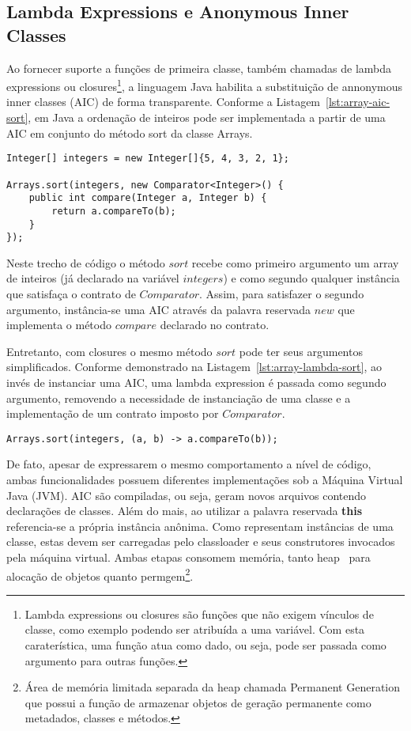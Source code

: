 \documentclass[10pt, conference]{IEEEtran}
\begin{document}
\subsection{Lambda Expressions e Anonymous Inner Classes}
Ao fornecer suporte a funções de primeira classe, também chamadas de lambda expressions ou closures\footnote{Lambda expressions ou closures são funções que não exigem vínculos de classe, como exemplo podendo ser atribuída a uma variável. Com esta caraterística, uma função atua como dado, ou seja, pode ser passada como argumento para outras funções.}, a linguagem Java habilita a substituição de annonymous inner classes (AIC) de forma transparente. Conforme a Listagem~\ref{lst:array-aic-sort}, em Java a ordenação de inteiros pode ser implementada a partir de uma AIC em conjunto do método sort da classe Arrays.

\begin{lstlisting}[caption={Sort - Anonymous Inner Class}, label={lst:array-aic-sort}]
Integer[] integers = new Integer[]{5, 4, 3, 2, 1};

Arrays.sort(integers, new Comparator<Integer>() {
    public int compare(Integer a, Integer b) {
        return a.compareTo(b);
    }
});
\end{lstlisting}

Neste trecho de código o método $sort$ recebe como primeiro argumento um array de inteiros (já declarado na variável $integers$) e como segundo qualquer instância que satisfaça o contrato de $Comparator$. Assim, para satisfazer o segundo argumento, instância-se uma AIC através da palavra reservada $new$ que implementa o método $compare$ declarado no contrato.

Entretanto, com closures o mesmo método $sort$ pode ter seus argumentos simplificados. Conforme demonstrado na Listagem~\ref{lst:array-lambda-sort}, ao invés de instanciar uma AIC, uma lambda expression é passada como segundo argumento, removendo a necessidade de instanciação de uma classe e a implementação de um contrato imposto por $Comparator$.

\begin{lstlisting}[caption={Sort - Lambda Expression}, label={lst:array-lambda-sort}]
Arrays.sort(integers, (a, b) -> a.compareTo(b));
\end{lstlisting}

De fato, apesar de expressarem o mesmo comportamento a nível de código, ambas funcionalidades possuem diferentes implementações sob a Máquina Virtual Java (JVM). AIC são compiladas, ou seja, geram novos arquivos contendo declarações de classes. Além do mais, ao utilizar a palavra reservada \textbf{this} referencia-se a própria instância anônima. Como representam instâncias de uma classe, estas devem ser carregadas pelo classloader e seus construtores invocados pela máquina virtual. Ambas etapas consomem memória, tanto heap~\cite{hunt2011java} para alocação de objetos quanto permgem\footnote{Área de memória limitada separada da heap chamada Permanent Generation que possui a função de armazenar objetos de geração permanente como metadados, classes e métodos.}.
\end{document}
